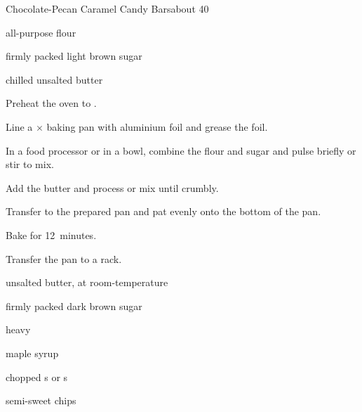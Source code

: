 \begin{recipe}{Chocolate-Pecan Caramel Candy Bars}{}{about 40}


\begin{ingredients}
\item \C{1 \half} all-purpose flour
\item \C{\half} firmly packed light brown sugar
\item \C{\half} chilled unsalted butter
\end{ingredients}

\begin{directions}
\item Preheat the oven to .
\item Line a $\times$ baking pan with aluminium foil and grease the foil.
\item In a food processor or in a bowl, combine the flour and sugar and pulse briefly or stir to mix.
\item Add the butter and process or mix until crumbly.
\item Transfer to the prepared pan and pat evenly onto the bottom of the pan.
\item Bake for 12~minutes.
\item Transfer the pan to a rack.
\end{directions}


\begin{ingredients}
\item {} unsalted butter, at room-temperature
\item {} firmly packed dark brown sugar
\item {} 
\item {} heavy 
\item {} maple syrup
\item \C{1 \half} chopped s or s
\item \C{\half} semi-sweet  chips
\end{ingredients}


\end{recipe}
